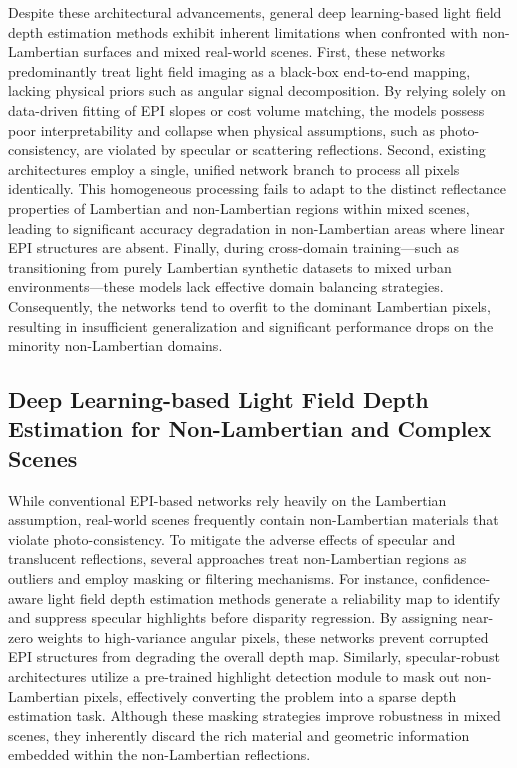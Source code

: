 \documentclass[lettersize,journal]{IEEEtran}
\begin{document}
Despite these architectural advancements, general deep learning-based light field depth estimation methods exhibit inherent limitations when confronted with non-Lambertian surfaces and mixed real-world scenes. First, these networks predominantly treat light field imaging as a black-box end-to-end mapping, lacking physical priors such as angular signal decomposition. By relying solely on data-driven fitting of EPI slopes or cost volume matching, the models possess poor interpretability and collapse when physical assumptions, such as photo-consistency, are violated by specular or scattering reflections. Second, existing architectures employ a single, unified network branch to process all pixels identically. This homogeneous processing fails to adapt to the distinct reflectance properties of Lambertian and non-Lambertian regions within mixed scenes, leading to significant accuracy degradation in non-Lambertian areas where linear EPI structures are absent. Finally, during cross-domain training---such as transitioning from purely Lambertian synthetic datasets to mixed urban environments---these models lack effective domain balancing strategies. Consequently, the networks tend to overfit to the dominant Lambertian pixels, resulting in insufficient generalization and significant performance drops on the minority non-Lambertian domains.

\subsection{Deep Learning-based Light Field Depth Estimation for Non-Lambertian and Complex Scenes}

While conventional EPI-based networks rely heavily on the Lambertian assumption, real-world scenes frequently contain non-Lambertian materials that violate photo-consistency. To mitigate the adverse effects of specular and translucent reflections, several approaches treat non-Lambertian regions as outliers and employ masking or filtering mechanisms. For instance, confidence-aware light field depth estimation methods \cite{he2016} generate a reliability map to identify and suppress specular highlights before disparity regression. By assigning near-zero weights to high-variance angular pixels, these networks prevent corrupted EPI structures from degrading the overall depth map. Similarly, specular-robust architectures utilize a pre-trained highlight detection module to mask out non-Lambertian pixels, effectively converting the problem into a sparse depth estimation task. Although these masking strategies improve robustness in mixed scenes, they inherently discard the rich material and geometric information embedded within the non-Lambertian reflections.
\end{document}
